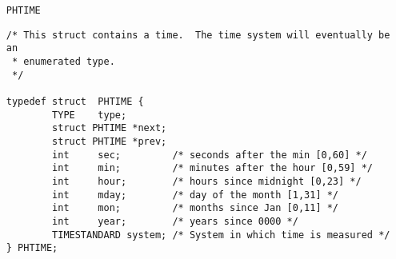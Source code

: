 {\begin{itemize}
\begin{verbatim}
typedef struct TEMPLATE {
  TYPE type;
  struct TEMPLATE *next;
  struct TEMPLATE *prev;
  const int id;
  REGION *region;
 } TEMPLATE;
\end{verbatim}

\item[{\tt PHTIME}]

\begin{verbatim}
/* This struct contains a time.  The time system will eventually be an
 * enumerated type.
 */

typedef struct  PHTIME {
        TYPE    type;
        struct PHTIME *next;
        struct PHTIME *prev;
        int     sec;         /* seconds after the min [0,60] */
        int     min;         /* minutes after the hour [0,59] */
        int     hour;        /* hours since midnight [0,23] */
        int     mday;        /* day of the month [1,31] */
        int     mon;         /* months since Jan [0,11] */
        int     year;        /* years since 0000 */
        TIMESTANDARD system; /* System in which time is measured */
} PHTIME;
\end{verbatim}

\end{itemize}
}				%



